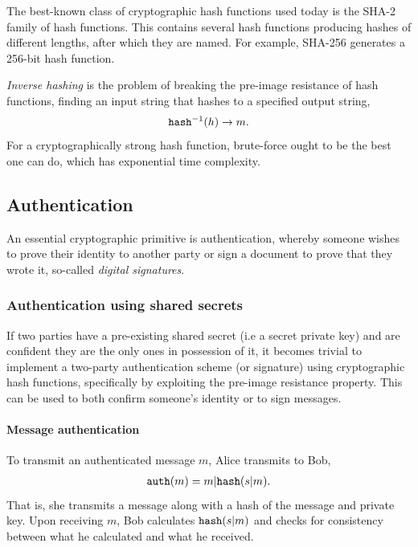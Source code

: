 The best-known class of cryptographic hash functions used today is the SHA-2 family of hash functions. This contains several hash functions producing hashes of different lengths, after which they are named. For example, SHA-256 generates a 256-bit hash function.

\emph{Inverse hashing} is the problem of breaking the pre-image resistance of hash functions, finding an input string that hashes to a specified output string,
\begin{align}
	{\tt hash}^{-1}(h)\to m.
\end{align}
For a cryptographically strong hash function, brute-force ought to be the best one can do, which has exponential time complexity.

\subsection{Authentication}

An essential cryptographic primitive is authentication, whereby someone wishes to prove their identity to another party or sign a document to prove that they wrote it, so-called \emph{digital signatures}.

\subsubsection{Authentication using shared secrets} \label{authentication-using-shared-secrets}

If two parties have a pre-existing shared secret (i.e a secret private key) and are confident they are the only ones in possession of it, it becomes trivial to implement a two-party authentication scheme (or signature) using cryptographic hash functions, specifically by exploiting the pre-image resistance property. This can be used to both confirm someone's identity or to sign messages.

\paragraph{Message authentication}

To transmit an authenticated message $m$, Alice transmits to Bob,
\begin{align}
	{\tt auth}(m) = m|{\tt hash}(s|m).
\end{align}
That is, she transmits a message along with a hash of the message and private key. Upon receiving $m$, Bob calculates ${\tt hash}(s|m)$ and checks for consistency between what he calculated and what he received.

